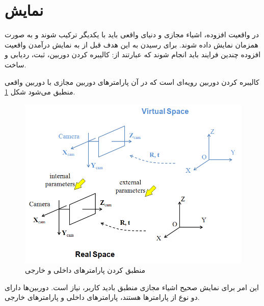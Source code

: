\section{نمایش}
در واقعیت افزوده، اشیاء مجازی و دنیای واقعی باید با یکدیگر ترکیب شوند و به صورت همزمان نمایش داده
شوند. برای رسیدن به این هدف قبل از به نمایش درآمدن واقعیت افزوده چندین فرایند باید انجام شوند که
عبارتند از: کالیبره کردن دوربین، ثبت، ردیابی و ساخت.

کالیبره کردن دوربین رویه‌ای است که در آن پارامترهای دوربین مجازی با دوربین واقعی منطبق می‌شود شکل \ref{fig:Billinghurst}. 

\begin{figure}
	\centering
	\includegraphics[width=1\linewidth]{image/realspace}
	\caption {منطبق کردن پارامترهای داخلی و خارجی \cite{Billinghurst}}
	\label{fig:Billinghurst}
\end{figure}

این امر برای نمایش صحیح اشیاء مجازی منطبق بادید کاربر، نیاز است. دوربین‌ها دارای دو نوع از پارامترها هستند، پارامترهای داخلی و پارامترهای خارجی. 

